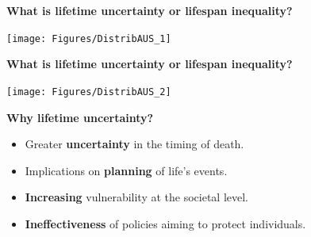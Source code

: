 \documentclass[xcolor={dvipsnames}]{beamer}
\begin{document}
\begin{frame}
	\begin{center}
		\Large{\textbf{What is lifetime uncertainty or lifespan inequality?}}
	\end{center}


	\begin{center}
		\texttt{[image: Figures/DistribAUS\_1]}
	\end{center}
	
\end{frame}

\begin{frame}
	\begin{center}
		\Large{\textbf{What is lifetime uncertainty or lifespan inequality?}}
	\end{center}


	\begin{center}
		\texttt{[image: Figures/DistribAUS\_2]}
	\end{center}
			
\end{frame}

\begin{frame}
\LARGE{
\textbf{Why lifetime uncertainty?}
		\begin{itemize}
		
		\item Greater \textbf{uncertainty} in the timing of death. \pause

		\item Implications on \textbf{planning} of life's events. \pause
		
		\item \textbf{Increasing} vulnerability at the societal level. \pause
		
		\item \textbf{Ineffectiveness} of policies aiming to protect individuals.
						
		\end{itemize}

}
\end{frame}

%
%
%
%
%
\end{document}
